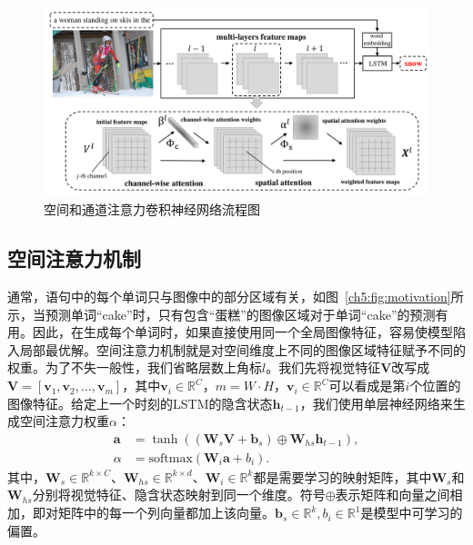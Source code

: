 \begin{figure}[tbp]
    \centering
    \includegraphics[width=\linewidth]{chapter5/res/architecture.pdf}
    \caption{空间和通道注意力卷积神经网络流程图}
    \label{ch5:fig:architecture}
\end{figure}

\subsection{空间注意力机制}
通常，语句中的每个单词只与图像中的部分区域有关，如图~\ref{ch5:fig:motivation}所示，当预测单词“cake”时，只有包含“蛋糕”的图像区域对于单词“cake”的预测有用。因此，在生成每个单词时，如果直接使用同一个全局图像特征，容易使模型陷入局部最优解。空间注意力机制就是对空间维度上不同的图像区域特征赋予不同的权重。为了不失一般性，我们省略层数上角标$l$。我们先将视觉特征$\bm{V}$改写成$\bm{V}  = \left[\bm{v}_1, \bm{v}_2, ..., \bm{v}_m
\right]$，其中$\bm{v}_i\in\mathbb{R}^C$，$m=W\cdot H$，$\bm{v}_i\in\mathbb{R}^C$可以看成是第$i$个位置的图像特征。给定上一个时刻的LSTM的隐含状态$\bm{h}_{t-1}$，我们使用单层神经网络来生成空间注意力权重$\alpha$：
\begin{equation} \label{ch5:eq:eq_5}
\begin{split}
\bm{a} & = \tanh \left( \left( \bm{W}_s \bm{V} + \bm{b}_s \right) \oplus \bm{W}_{hs}\bm{h}_{t-1}\right), \\
\alpha & = \textrm{softmax} \left( \bm{W}_i \bm{a} + b_i \right).
\end{split}
\end{equation}
其中，$\bm{W}_s \in \mathbb{R}^{k \times C}$、$\bm{W}_{hs} \in \mathbb{R}^{k \times d}$、$\bm{W}_i \in \mathbb{R}^k$都是需要学习的映射矩阵，其中$\bm{W}_s$和$\bm{W}_{hs}$分别将视觉特征、隐含状态映射到同一个维度。符号$\oplus$表示矩阵和向量之间相加，即对矩阵中的每一个列向量都加上该向量。$\bm{b}_s \in \mathbb{R}^k, b_i \in \mathbb{R}^1$是模型中可学习的偏置。


